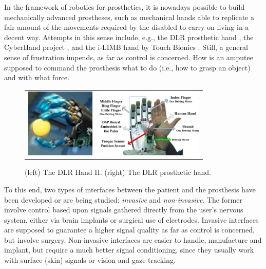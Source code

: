 In the framework of robotics for prosthetics, it is nowadays
possible to build mechanically advanced prostheses, such as
mechanical hands able to replicate a fair amount of the movements
required by the disabled to carry on living in a decent way.
Attempts in this sense include, e.g., the DLR prosthetic hand
\cite{Hua2006}, the CyberHand project \cite{cyberhand}, and the
i-LIMB hand by Touch Bionics \cite{ilimb}. Still, a general sense
of frustration impends, as far as control is concerned. How is an
amputee supposed to command the prosthesis what to do (i.e., how
to grasp an object) and with what force.

\begin{figure}
  \begin{tabular}{cc}
    \includegraphics[height=3.3cm]{figs/DLRHand-Ball-comp.jpg} &
    \includegraphics[height=3.3cm]{figs/DLR-Prothese.jpg}
  \end{tabular}
  \caption{(left) The DLR Hand II. (right) The DLR prosthetic hand.}
  \label{fig:DLRHandII}
\end{figure}
To this end, two types of interfaces between the patient and the
prosthesis have been developed or are being studied:
\emph{invasive} and \emph{non-invasive}. The former involve
control based upon signals gathered directly from the user's
nervous system, either via brain implants or surgical use of
electrodes. Invasive interfaces are supposed to guarantee a higher
signal quality as far as control is concerned, but involve
surgery. Non-invasive interfaces are easier to handle, manufacture
and implant, but require a much better signal conditioning, since
they usually work with surface (skin) signals or vision and gaze
tracking.

